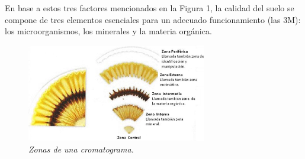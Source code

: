 En base a estos tres factores mencionados en la Figura 1, la calidad del suelo se compone de tres elementos esenciales para un adecuado funcionamiento (las 3M): los microorganismos, los minerales y la materia orgánica.

\begin{figure}[H]
 \centering	
   \includegraphics[width=0.7\textwidth]{images/2.png}
   \caption{\textit{Zonas de una cromatograma.}}
   \end{figure}	